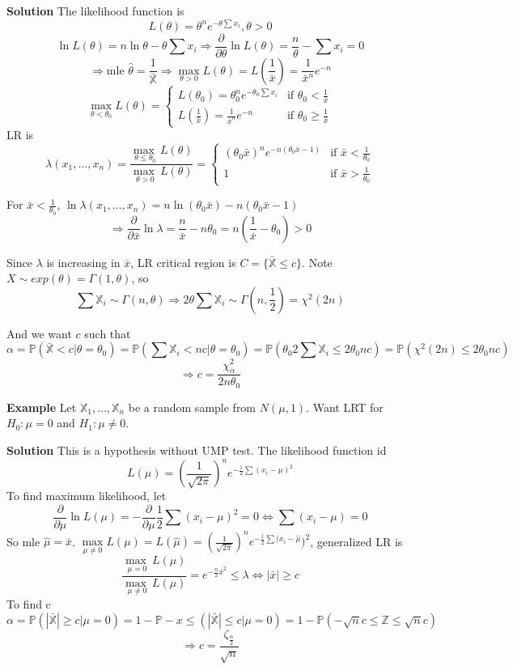\textbf{Solution} The likelihood function is
$$L(\theta) = \theta^n e^{-\theta \sum x_i}, \theta > 0$$
$$\ln L(\theta) = n \ln \theta - \theta \sum x_i  \Rightarrow \frac{\partial}{\partial \theta}\ln L(\theta) = \frac{n}{\theta} - \sum x_i = 0$$
$$\Rightarrow \text{mle } \hat{\theta} = \frac{1}{\bar{\mathbb{X}}} 
\Rightarrow \underset{\theta>0}{\max} L(\theta) = L(\frac{1}{\bar{x}}) = \frac{1}{\bar{x}^n}e^{-n}$$
$$\underset{\theta < \theta_0}{\max} L(\theta) = 
\begin{cases}
L(\theta_0) = \theta_0^n e^{-\theta_0 \sum x_i} & \text{if } \theta_0 <  \frac{1}{\bar{x}} \\
L(\frac{1}{\bar{x}}) = \frac{1}{\bar{x}^n}e^{-n} & \text{if } \theta_0 \geq \frac{1}{\bar{x}}
\end{cases}$$
LR is
$$\lambda(x_1, ..., x_n) = \frac{\underset{\theta \leq \theta_0}{\max\ } L(\theta)}{\underset{\theta > 0}{\max\ } L(\theta)}
= \begin{cases}
(\theta_0 \bar{x})^n e^{-n(\theta_0 \bar{x} - 1)} & \text{if } \bar{x} < \frac{1}{\theta_0} \\
1 & \text{if } \bar{x} > \frac{1}{\theta_0}
\end{cases}$$

For $\bar{x} < \frac{1}{\theta_0} $, $\ln \lambda(x_1, ..., x_n) = n \ln(\theta_0 \bar{x}) -n(\theta_0 \bar{x} - 1)$
$$\Rightarrow \frac{\partial}{\partial \bar{x}} \ln \lambda = \frac{n}{\bar{x}} - n\theta_0 = n(\frac{1}{\bar{x}} - \theta_0) > 0$$

Since $\lambda$ is increasing in $\bar{x}$, LR critical region is $C = \{\bar{\mathbb{X}} \leq c\}$. 
Note $X \sim exp(\theta) = \Gamma(1, \theta)$, so 
$$\sum \mathbb{X}_i \sim \Gamma(n, \theta) \Rightarrow 2 \theta \sum \mathbb{X}_i \sim \Gamma(n, \frac{1}{2}) = \chi^2(2n)$$

And we want $c$ such that
$$\alpha = \mathbb{P}(\bar{\mathbb{X}} < c | \theta = \theta_0) = \mathbb{P}(\sum \mathbb{X}_i < nc | \theta = \theta_0)
= \mathbb{P}(\theta_0 2 \sum \mathbb{X}_i \leq 2\theta_0 nc) = \mathbb{P}(\chi^2(2n) \leq 2\theta_0 nc)$$
$$\Rightarrow c = \frac{\chi^2_\alpha}{2n\theta_0}$$

\textbf{Example}  Let $\mathbb{X}_1, ..., \mathbb{X}_n$ be a random sample from $N(\mu, 1)$. Want LRT for $H_0: \mu = 0$ and $H_1: \mu \neq 0$.

\textbf{Solution} This is a hypothesis without UMP test. The likelihood function id
$$L(\mu) = ( \frac{1}{\sqrt{2\pi}} )^n e^{-\frac{1}{2}\sum(x_i-\mu)^2}$$
To find maximum likelihood, let
$$\frac{\partial}{\partial \mu} \ln L(\mu) = -\frac{\partial}{\partial \mu}\frac{1}{2}\sum(x_i-\mu)^2
= 0 \iff \sum(x_i-\mu) = 0$$
So mle $\hat{\mu} = \bar{x}$. $\underset{\mu\neq 0}{\max} L(\mu) = L(\hat{\mu}) = ( \frac{1}{\sqrt{2\pi}} )^n e^{-\frac{1}{2}\sum(x_i-\hat\mu})^2$, generalized LR is
$$
\frac{\underset{\mu = 0}{\max\ } L(\mu)}{\underset{\mu\neq 0}{\max\ } L(\mu)}
= e^{-\frac{n}{2}\bar{x}^2} \leq \lambda \iff |\bar{x}| \geq c
$$
To find c
$$\alpha = \mathbb{P}(|\bar{\mathbb{X}}| \geq c | \mu = 0) =
1- \mathbb{P}-x \leq (|\bar{\mathbb{X}}| \leq c | \mu = 0) = 
1-\mathbb{P}(-\sqrt{n}c \leq \mathbb{Z} \leq \sqrt{n}c)$$
$$\Rightarrow c = \frac{\zeta_{\frac{\alpha}{2}}}{\sqrt{n}}$$

